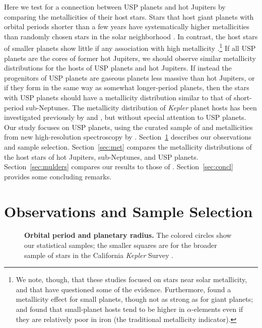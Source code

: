 \documentclass[twocolumn]{aastex6}
\begin{document}
Here we test for a connection between USP planets and hot Jupiters by
comparing the metallicities of their host stars.  Stars that host
giant planets with orbital periods shorter than a few years have
systematically higher metallicities than randomly chosen stars in the
solar neighborhood \citep{Gonzalez1997, Santos+2004,
  FischerValenti2005}. In contrast, the host stars of smaller planets
show little if any association with high metallicity \citep{Udry+2006,
  Sousa+2011, SchlaufmanLaughlin2011, Buchhave+2012}.\footnote{We
  note, though, that these studies focused on stars near solar
  metallicity, and that \citet{Zhu+2016} have questioned some of the
  evidence. Furthermore, \citet{WangFischer2015} found a metallicity
  effect for small planets, though not as strong as for giant planets;
  and \citet{Adibekyan+2012} found that small-planet hosts tend to be
  higher in $\alpha$-elements even if they are relatively poor in iron
  (the traditional metallicity indicator).} If all USP planets are the
cores of former hot Jupiters, we should observe similar metallicity
distributions for the hosts of USP planets and hot Jupiters. If
instead the progenitors of USP planets are gaseous planets less
massive than hot Jupiters, or if they form in the same way as somewhat
longer-period planets, then the stars with USP planets should have a
metallicity distribution similar to that of short-period
sub-Neptunes. The metallicity distribution of {\it Kepler} planet
hosts has been investigated previously by \citet{Buchhave+2012,
  Mann+2013, Buchhave+2014, Dong+2014, Schlaufman2015,
  BuchhaveLatham2015, Guo+2016} and \citet{Mulders+2016}, but without
special attention to USP planets. Our study focuses on USP planets,
using the curated sample of \citet{SanchisOjeda+2014} and
metallicities from new high-resolution spectroscopy by
\citet{Petigura+2017}.  Section~\ref{sec:obs} describes our
observations and sample selection.  Section~\ref{sec:met} compares the
metallicity distributions of the host stars of hot Jupiters,
sub-Neptunes, and USP planets. Section~\ref{sec:mulders} compares our
results to those of \citet{Mulders+2016}.  Section~\ref{sec:concl}
provides some concluding remarks.

\section{Observations and Sample Selection}
\label{sec:obs}

\begin{figure*}
\begin{center}
  \end{center}
  \vspace{-0.25in}
  \caption{ {\bf Orbital period and planetary radius.}  The colored
    circles show our statistical samples; the smaller squares are for
    the broader sample of stars in the California {\it Kepler} Survey
    \citep{Petigura+2017}. }
  \label{fig:period_radius}
\end{figure*}
\end{document}
